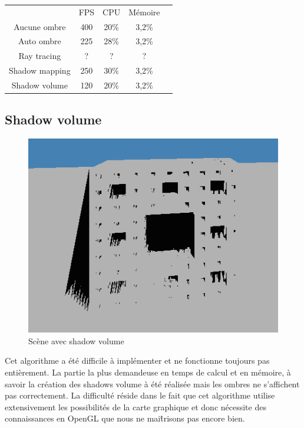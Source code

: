 \documentclass[a4paper,12pt]{report}
\begin{document}
\begin{table}[h]
\centering
\begin{tabular}{|c|c|c|c|l}
\cline{1-4}
 & FPS  & CPU & Mémoire  &  \\ \cline{1-4}
 Aucune ombre& 400 & 20\%  & 3,2\%  &  \\ \cline{1-4}
 Auto ombre& 225 & 28\%  & 3,2\%  &  \\ \cline{1-4}
 Ray tracing& ? & ?  & ?  &  \\ \cline{1-4}
 Shadow mapping& 250  & 30\%  & 3,2\%  &  \\ \cline{1-4}
 Shadow volume& 120  & 20\%  & 3,2\%  &  \\ \cline{1-4}
\end{tabular}
\end{table}

\subsection{Shadow volume}

\begin{figure}[H]
\includegraphics[scale=0.4]{images/shadowvolume.png}
\centering
\caption{Scène avec shadow volume}
\end{figure}

Cet algorithme a été difficile à implémenter et ne fonctionne toujours pas entièrement. La partie la plus demandeuse en temps de calcul et en mémoire, à savoir la création des shadows volume à été réalisée mais les ombres ne s'affichent pas correctement. La difficulté réside dans le fait que cet algorithme utilise extensivement les possibilités de la carte graphique et donc nécessite des connaissances en OpenGL que nous ne mai\^trisons pas encore bien.
\end{document}
